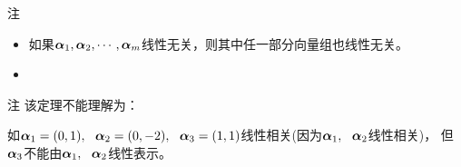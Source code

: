 \begin{frame}
  \begin{footnotesize}
    \begin{block}{注}
      \begin{itemize}
      \item 如果$\boldsymbol{\alpha}_1,\boldsymbol{\alpha}_2,\cdots,\boldsymbol{\alpha}_m$线性无关，则其中任一部分向量组也线性无关。\\[0.1in]              
      \item     {}
      \end{itemize}
      
    \end{block}

    \pause 
    \begin{block}{注}
      该定理不能理解为： \pause 
      \vspace{0.1in}

      如$\boldsymbol{\alpha}_1=(0,1), ~~\boldsymbol{\alpha}_2=(0,-2), ~~\boldsymbol{\alpha}_3=(1,1)$线性相关(因为$\boldsymbol{\alpha}_1,~~\boldsymbol{\alpha}_2$线性相关)，
      但$\boldsymbol{\alpha}_3$不能由$\boldsymbol{\alpha}_1,~~\boldsymbol{\alpha}_2$线性表示。
      
    \end{block}
    
  \end{footnotesize}
\end{frame}

